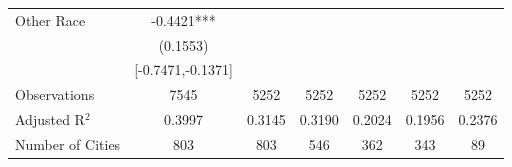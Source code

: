 \documentclass{article}
\begin{document}
\begin{table}[htbp]
\begin{tabular}{l*{6}{c}}
Other Race          &     -0.4421***&               &               &               &               &               \\
                    &    (0.1553)   &               &               &               &               &               \\
                    &[-0.7471,-0.1371]   &               &               &               &               &               \\
\midrule
Observations        &        7545   &        5252   &        5252   &        5252   &        5252   &        5252   \\
Adjusted R$^2$      &      0.3997   &      0.3145   &      0.3190   &      0.2024   &      0.1956   &      0.2376   \\
Number of Cities    &         803   &         803   &         546   &         362   &         343   &          89   \\
\bottomrule
\end{tabular}
\end{table}
\end{document}
